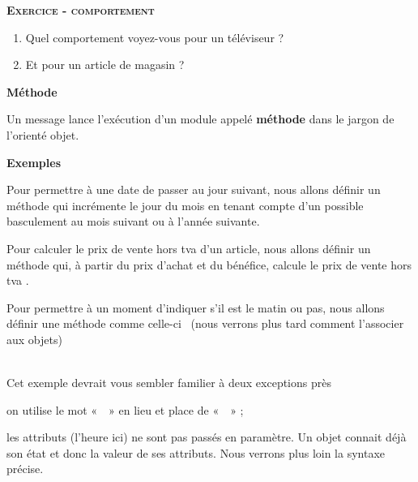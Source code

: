 {\sffamily\bfseries\scshape
Exercice - comportement}

\begin{enumerate}
	\item {
		Quel comportement voyez-vous pour un téléviseur ?}
	\item {
		Et pour un article de magasin ?}
\end{enumerate}

\bigskip

{\sffamily\bfseries\upshape
Méthode}

{Un message lance l'exécution d'un
module appelé \textbf{méthode} dans le jargon de
l'orienté objet. }

{\bfseries
Exemples}

\begin{liste}
	\item {
		Pour permettre à une date de passer au jour suivant, nous allons définir
		un méthode qui incrémente le jour du mois en tenant compte
		d'un possible basculement au mois suivant ou à
		l'année suivante.}
	\item {
		Pour calculer le prix de vente hors tva d'un article, nous allons définir
		un méthode qui, à partir du prix d'achat et du bénéfice,
		calcule le prix de vente hors tva .}
	
	\item {
		Pour permettre à un moment d'indiquer
		s'il est le matin ou pas, nous allons définir une
		méthode comme celle-ci \ (nous verrons plus tard comment
		l'associer aux objets)}

		\bigskip

		\\
		\bigskip
		{
		Cet exemple devrait vous sembler familier à deux exceptions près}

		\liststyleListv
		\begin{liste}
			\item {
				on utilise le mot «~~» en lieu et place de
				«~~» ;}
			\item {
				les attributs (l'heure ici) ne sont pas passés en
				paramètre. Un objet connait déjà son état et donc la valeur de ses
				attributs. Nous verrons plus loin la syntaxe précise.}
	\end{liste}
\end{liste}

